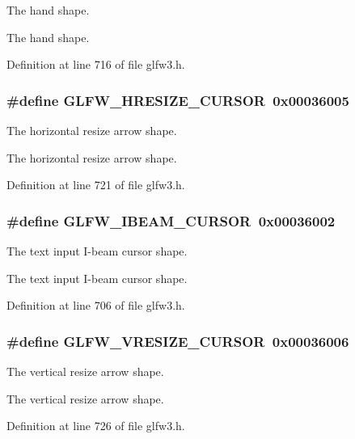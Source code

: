 The hand shape. 

The hand shape. 

Definition at line 716 of file glfw3.h.\hypertarget{group__shapes_gbb3eb0109f11bb808fc34659177ca962}{
\subsubsection[GLFW\_\-HRESIZE\_\-CURSOR]{\setlength{\rightskip}{0pt plus 5cm}\#define GLFW\_\-HRESIZE\_\-CURSOR~0x00036005}}
\label{group__shapes_gbb3eb0109f11bb808fc34659177ca962}


The horizontal resize arrow shape. 

The horizontal resize arrow shape. 

Definition at line 721 of file glfw3.h.\hypertarget{group__shapes_g36185f4375eaada1b04e431244774c86}{
\subsubsection[GLFW\_\-IBEAM\_\-CURSOR]{\setlength{\rightskip}{0pt plus 5cm}\#define GLFW\_\-IBEAM\_\-CURSOR~0x00036002}}
\label{group__shapes_g36185f4375eaada1b04e431244774c86}


The text input I-beam cursor shape. 

The text input I-beam cursor shape. 

Definition at line 706 of file glfw3.h.\hypertarget{group__shapes_gf024f0e1ff8366fb2b5c260509a1fce5}{
\subsubsection[GLFW\_\-VRESIZE\_\-CURSOR]{\setlength{\rightskip}{0pt plus 5cm}\#define GLFW\_\-VRESIZE\_\-CURSOR~0x00036006}}
\label{group__shapes_gf024f0e1ff8366fb2b5c260509a1fce5}


The vertical resize arrow shape. 

The vertical resize arrow shape. 

Definition at line 726 of file glfw3.h.